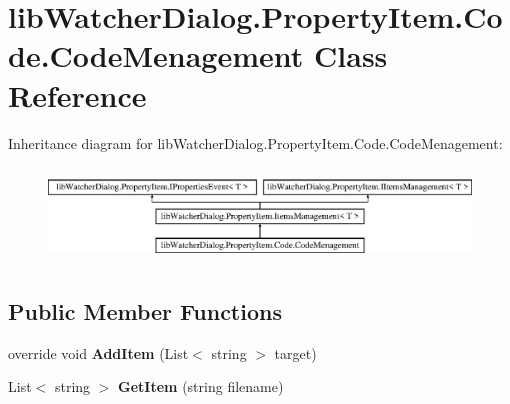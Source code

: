 \hypertarget{classlib_watcher_dialog_1_1_property_item_1_1_code_1_1_code_menagement}{\section{lib\+Watcher\+Dialog.\+Property\+Item.\+Code.\+Code\+Menagement Class Reference}
\label{classlib_watcher_dialog_1_1_property_item_1_1_code_1_1_code_menagement}
}
Inheritance diagram for lib\+Watcher\+Dialog.\+Property\+Item.\+Code.\+Code\+Menagement\+:\begin{figure}[H]
\begin{center}
\leavevmode
\includegraphics[height=2.537765cm]{classlib_watcher_dialog_1_1_property_item_1_1_code_1_1_code_menagement}
\end{center}
\end{figure}
\subsection*{Public Member Functions}
\begin{DoxyCompactItemize}
\item 
\hypertarget{classlib_watcher_dialog_1_1_property_item_1_1_code_1_1_code_menagement_acf0505327f6cf8b8dc922d935bacc054}{override void {\bfseries Add\+Item} (List$<$ string $>$ target)}\label{classlib_watcher_dialog_1_1_property_item_1_1_code_1_1_code_menagement_acf0505327f6cf8b8dc922d935bacc054}

\item 
\hypertarget{classlib_watcher_dialog_1_1_property_item_1_1_code_1_1_code_menagement_ac1c0936a5c530c4ac07c4296f3d57d0d}{List$<$ string $>$ {\bfseries Get\+Item} (string filename)}\label{classlib_watcher_dialog_1_1_property_item_1_1_code_1_1_code_menagement_ac1c0936a5c530c4ac07c4296f3d57d0d}

\end{DoxyCompactItemize}
